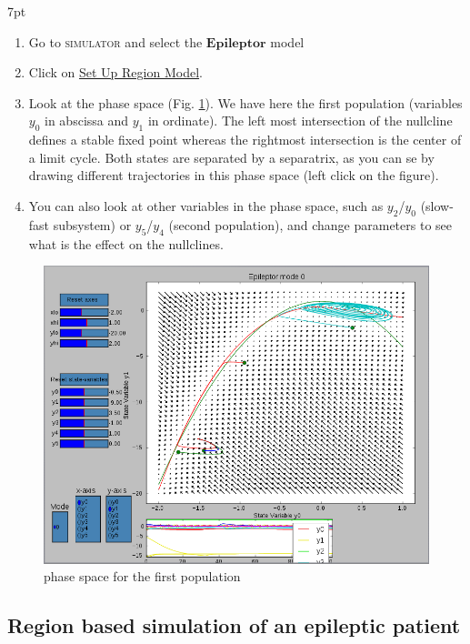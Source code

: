 \documentclass{tufte-handout}
\newenvironment{formal}{%
  \def\FrameCommand{%
    \hspace{1pt}%
    {\color{DarkBlue}\vrule width 2pt}%
    {\color{formalshade}\vrule width 4pt}%
    \colorbox{formalshade}%
  }%
  \MakeFramed{\advance\hsize-\width\FrameRestore}%
  \noindent\hspace{-4.55pt}%
  \begin{adjustwidth}{}{7pt}%
  \vspace{2pt}\vspace{2pt}%
}
{%
  \vspace{2pt}\end{adjustwidth}\endMakeFramed%
}
\begin{document}
\begin{formal}
  \begin{enumerate}[resume]
  \item Go to \textsc{simulator} and select the $\mathbf{Epileptor}$ model
  \item Click on \underline{Set Up Region Model}.
  \item Look at the phase space (Fig. \ref{fig:phase_space}). We have here the first population (variables $y_0$ in abscissa and 
  $y_1$ in ordinate).
  The left most intersection of the nullcline defines a stable fixed point whereas the rightmost intersection 
  is the center of a limit cycle. Both states are separated by a separatrix, as you can se by drawing different trajectories
  in this phase space (left click on the figure).
  \item You can also look at other variables in the phase space, such as $y_2$/$y_0$ (slow-fast subsystem) or 
  $y_5$/$y_4$ (second population), and change parameters to see what is the effect on the nullclines.
  \end{enumerate}
\end{formal}


\begin{figure}[h]
  \includegraphics[width=\linewidth]{Handout_UI_ModellingAnEpilepticPatient_PhaseSpace}%
  \caption{phase space for the first population}%
  \label{fig:phase_space}%
\end{figure}
\subsection{Region based simulation of an epileptic patient}
\end{document}
